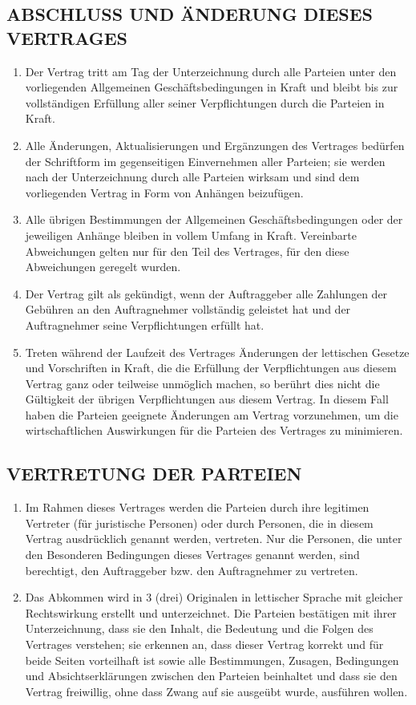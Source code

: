 \begin{multicols}{2}
   \subsection{ABSCHLUSS UND ÄNDERUNG DIESES VERTRAGES}
   \begin{enumerate}
   \item Der Vertrag tritt am Tag der Unterzeichnung durch alle Parteien unter den vorliegenden Allgemeinen Geschäftsbedingungen in Kraft und bleibt bis zur vollständigen Erfüllung aller seiner Verpflichtungen durch die Parteien in Kraft.
   \item Alle Änderungen, Aktualisierungen und Ergänzungen des Vertrages bedürfen der Schriftform im gegenseitigen Einvernehmen aller Parteien; sie werden nach der Unterzeichnung durch alle Parteien wirksam und sind dem vorliegenden Vertrag in Form von Anhängen beizufügen.
   \item Alle übrigen Bestimmungen der Allgemeinen Geschäftsbedingungen oder der jeweiligen Anhänge bleiben in vollem Umfang in Kraft. Vereinbarte Abweichungen gelten nur für den Teil des Vertrages, für den diese Abweichungen geregelt wurden.
   \item Der Vertrag gilt als gekündigt, wenn der Auftraggeber alle Zahlungen der Gebühren an den Auftragnehmer vollständig geleistet hat und der Auftragnehmer seine Verpflichtungen erfüllt hat.
   \item Treten während der Laufzeit des Vertrages Änderungen der lettischen Gesetze und Vorschriften in Kraft, die die Erfüllung der Verpflichtungen aus diesem  Vertrag ganz oder teilweise unmöglich machen, so berührt dies nicht die Gültigkeit der übrigen Verpflichtungen aus diesem Vertrag. In diesem Fall haben die Parteien geeignete Änderungen am Vertrag vorzunehmen, um die wirtschaftlichen Auswirkungen für die Parteien des Vertrages zu minimieren.
   \end{enumerate}

   \subsection{VERTRETUNG DER PARTEIEN}
   \begin{enumerate}
   \item Im Rahmen dieses Vertrages werden die Parteien durch ihre legitimen Vertreter (für juristische Personen) oder durch Personen, die in diesem Vertrag ausdrücklich genannt werden, vertreten. Nur die Personen, die unter den Besonderen Bedingungen dieses Vertrages genannt werden, sind berechtigt, den Auftraggeber bzw. den Auftragnehmer zu vertreten.
   \item Das Abkommen wird in 3 (drei) Originalen in lettischer Sprache mit gleicher Rechtswirkung erstellt und unterzeichnet. Die Parteien bestätigen mit ihrer Unterzeichnung, dass sie den Inhalt, die Bedeutung und die Folgen des Vertrages verstehen; sie erkennen an, dass dieser Vertrag korrekt und für beide Seiten vorteilhaft ist sowie alle Bestimmungen, Zusagen, Bedingungen und Absichtserklärungen zwischen den Parteien beinhaltet und dass sie den Vertrag freiwillig, ohne dass Zwang auf sie ausgeübt wurde, ausführen wollen.
   \end{enumerate}



\end{multicols}
